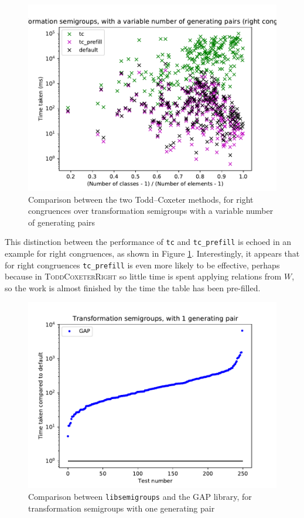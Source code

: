 \begin{figure}[h]
  \centering
  \includegraphics[width=\textwidth]{pics/ch-pairs/bench-trans-tc-vp-right-bynrclasses}
  \caption[Benchmark: Todd--Coxeter, concrete, right, $n$ pairs]
  {Comparison between the two Todd--Coxeter methods, for right
    congruences over transformation semigroups with a variable number of
    generating pairs}
  \label{fig:bench-trans-tc-vp-right-bynrclasses}
\end{figure}

This distinction between the performance of \texttt{tc} and \texttt{tc\_prefill}
is echoed in an example for right congruences, as shown in Figure
\ref{fig:bench-trans-tc-vp-right-bynrclasses}.  Interestingly, it appears that
for right congruences \texttt{tc\_prefill} is even more likely to be effective,
perhaps because in \textsc{ToddCoxeterRight} so little time is spent applying
relations from $W$, so the work is almost finished by the time the table has
been pre-filled.

\begin{figure}[h]
  \centering
  \includegraphics[width=\textwidth]{pics/ch-pairs/bench-trans-1p-gap}
  \caption[Benchmark: GAP/\texttt{libsemigroups}, concrete, 1 pair]
  {Comparison between \texttt{libsemigroups} and the GAP library, for
    transformation semigroups with one generating pair}
  \label{fig:bench-trans-1p-gap}
\end{figure}

